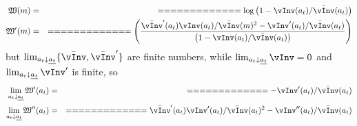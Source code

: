 \newcommand{\vPF}{\bar{\vInv}}
\newcommand{\cPF}{\bar{\cFunc}}
\newcommand{\W}{\mathfrak{W}}
\newcommand{\at}{a_{t}}
\newcommand{\atDown}{\lim_{\at \downarrow \underline{\at}}}
  \begin{equation}\begin{gathered}\begin{aligned}
    \W(m)              & = &  =  =  =  =  =  =  =  =  =  =  =  =  = \log \left(1-\vInv(\at)/\vPF(\at)\right)
\\ \W^{\prime}(m)              & = &  =  =  =  =  =  =  =  =  =  =  =  =  = \left(\frac{\vPF^{\prime}(\at)\vInv(\at)/\vPF(m)^2-\vInv^{\prime}(\at)/\vPF(\at)}{\left(1-\vInv(\at)/\vPF(\at)\right) }\right)
  \end{aligned}\end{gathered}\end{equation}
but $\atDown \{\vPF,\vPF^{\prime}\}$ are finite numbers, while $\atDown \vInv = 0$ and $\atDown \vInv^{\prime}$ is finite, so
  \begin{equation}\begin{gathered}\begin{aligned}
   \atDown \W^{\prime}(\at)              & = &  =  =  =  =  =  =  =  =  =  =  =  =  = -\vInv^{\prime}(\at)/\vPF(\at)
\\ \atDown \W^{\prime\prime}(\at)              & = &  =  =  =  =  =  =  =  =  =  =  =  =  = \vPF^{\prime}(\at)\vInv^{\prime}(\at)/\vPF(\at)^{2}-\vInv^{\prime\prime}(\at)/\vPF(\at  )
  \end{aligned}\end{gathered}\end{equation}


